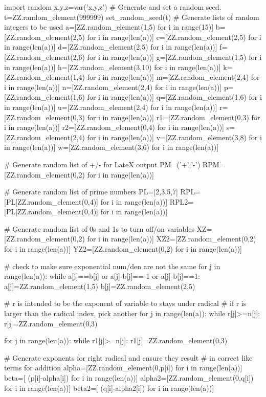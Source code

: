 \documentclass{article}%
\begin{document}
\begin{sagesilent}
import random
x,y,z=var('x,y,z')
# Generate and set a random seed.
t=ZZ.random_element(999999)
set_random_seed(t)
# Generate lists of random integers to be used
a=[ZZ.random_element(1,5) for i in range(15)]
b=[ZZ.random_element(2,5) for i in range(len(a))]
c=[ZZ.random_element(2,5) for i in range(len(a))]
d=[ZZ.random_element(2,5) for i in range(len(a))]
f=[ZZ.random_element(2,6) for i in range(len(a))]
g=[ZZ.random_element(1,5) for i in range(len(a))]
h=[ZZ.random_element(3,10) for i in range(len(a))]
k=[ZZ.random_element(1,4) for i in range(len(a))]
m=[ZZ.random_element(2,4) for i in range(len(a))]
n=[ZZ.random_element(2,4) for i in range(len(a))]
p=[ZZ.random_element(1,6) for i in range(len(a))]
q=[ZZ.random_element(1,6) for i in range(len(a))]
u=[ZZ.random_element(2,4) for i in range(len(a))]
r=[ZZ.random_element(0,3) for i in range(len(a))]
r1=[ZZ.random_element(0,3) for i in range(len(a))]
r2=[ZZ.random_element(0,4) for i in range(len(a))]
s=[ZZ.random_element(2,4) for i in range(len(a))]
v=[ZZ.random_element(3,8) for i in range(len(a))]
w=[ZZ.random_element(3,6) for i in range(len(a))]

# Generate random list of +/- for LateX output
PM=('+','-')
RPM=[ZZ.random_element(0,2) for i in range(len(a))]

# Generate random list of prime numbers
PL=[2,3,5,7]
RPL=[PL[ZZ.random_element(0,4)] for i in range(len(a))]
RPL2=[PL[ZZ.random_element(0,4)] for i in range(len(a))]

# Generate random list of 0s and 1s to turn off/on variables
XZ=[ZZ.random_element(0,2) for i in range(len(a))]
XZ2=[ZZ.random_element(0,2) for i in range(len(a))]
YZ2=[ZZ.random_element(0,2) for i in range(len(a))]

# check to make sure exponential num/den are not the same
for j in range(len(a)):
  while a[j]==b[j] or a[j]-b[j]==-1 or a[j]-b[j]==1:
    a[j]=ZZ.random_element(1,5)
    b[j]=ZZ.random_element(2,5)
    
# r is intended to be the exponent of variable to stays under radical
# if r is larger than the radical index, pick another
for j in range(len(a)):
  while r[j]>=n[j]:
    r[j]=ZZ.random_element(0,3)

for j in range(len(a)):
  while r1[j]>=n[j]:
    r1[j]=ZZ.random_element(0,3)    
    
# Generate exponents for right radical and ensure they result
# in correct like terms for addition
alpha=[ZZ.random_element(0,p[i]) for i in range(len(a))]  
beta=[ (p[i]-alpha[i])    for i in range(len(a))]
alpha2=[ZZ.random_element(0,q[i]) for i in range(len(a))]  
beta2=[ (q[i]-alpha2[i])    for i in range(len(a))]


\end{sagesilent}
\end{document}
